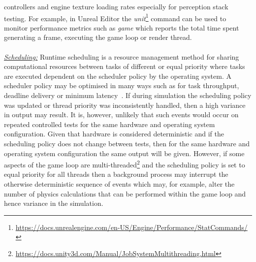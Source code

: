 \documentclass[letterpaper, 10 pt, journal, twoside]{IEEEtran}
\begin{document}
 controllers and engine texture loading rates especially for perception stack testing. %
For example, in Unreal Editor the \textit{unit}\footnote{\url{https://docs.unrealengine.com/en-US/Engine/Performance/StatCommands/}} command can be used to monitor performance metrics such as \textit{game} which reports 
the total time spent generating a frame, executing the game loop or render thread.
\\\\
\noindent\underline{\textit{Scheduling:}}
Runtime scheduling is a resource management method for sharing computational resources between tasks of different or equal priority where tasks are executed dependent on the scheduler policy by the operating system. A scheduler policy may be optimised in many ways such as for task throughput, deadline delivery or minimum latency~\cite{liu1973scheduling}. 
%
If during simulation the scheduling policy was updated or thread priority was inconsistently handled, then a high variance in output may result. It is, however, unlikely that such events would occur on repeated controlled tests for the same hardware and operating system configuration. 
Given that hardware is considered deterministic and if the scheduling policy does not change between tests, then for the same hardware and operating system configuration the same output will be given. 
%
However, if some aspects of the game loop are multi-threaded\footnote{\url{https://docs.unity3d.com/Manual/JobSystemMultithreading.html}} and the scheduling policy is set to equal priority for all threads then a background process may interrupt the otherwise deterministic sequence of events which may, for example, alter the number of physics calculations that can be performed within the game loop and hence variance in the simulation. 
\end{document}
